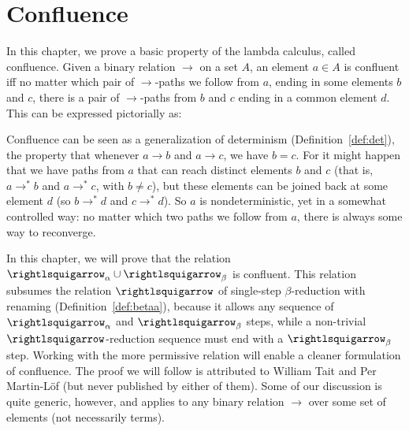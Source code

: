 \chapter{Confluence}

In this chapter, we prove a basic property of the lambda calculus,
called confluence. Given a binary relation $\to$ on
a set $A$, an element $a \in A$ is confluent iff no matter which pair
of $\to$-paths we follow from $a$, ending in some elements $b$ and
$c$, there is a pair of $\to$-paths from $b$ and $c$ ending in a
common element $d$.  This can be expressed pictorially as:

\begin{center}
\end{center}

Confluence can be seen as a generalization of determinism
(Definition~\ref{def:det}), the property that whenever $a \to b$ and $a
\to c$, we have $b = c$.  For it might happen that we have paths from
$a$ that can reach distinct elements $b$ and $c$ (that is, $a \to^* b$
and $a \to^* c$, with $b \neq c$), but these elements can be joined
back at some element $d$ (so $b \to^*d$ and $c\to^*d$).  So $a$ is
nondeterministic, yet in a somewhat controlled way: no matter
which two paths we follow from $a$, there is always some way to
reconverge.

In this chapter, we will prove that the relation $\curva_\alpha \cup
\curva_\beta$ is confluent.  This relation subsumes the relation
$\betaa$ of single-step $\beta$-reduction with renaming
(Definition~\ref{def:betaa}), because it allows any sequence of
$\curva_\alpha$ and $\curva_\beta$ steps, while a non-trivial
$\betaa$-reduction sequence must end with a $\curva_\beta$ step.
Working with the more permissive relation will enable a cleaner
formulation of confluence.  The proof we will follow is attributed to
William Tait and Per Martin-L\"of (but never published by either of
them).  Some of our discussion is quite generic, however, and applies
to any binary relation $\to$ over some set of elements (not
necessarily terms).

